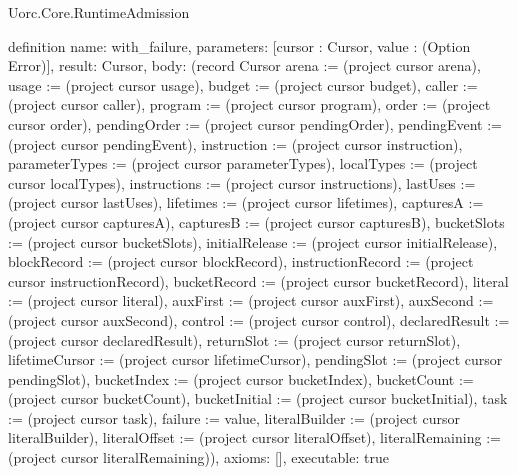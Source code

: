 \begin{lexlean}{Uorc.Core.RuntimeAdmission}
\begin{semanticmodule}
definition{
  name: with_failure,
  parameters: [cursor : Cursor, value : (Option Error)],
  result: Cursor,
  body: (record Cursor {arena := (project cursor arena), usage := (project cursor usage), budget := (project cursor budget), caller := (project cursor caller), program := (project cursor program), order := (project cursor order), pendingOrder := (project cursor pendingOrder), pendingEvent := (project cursor pendingEvent), instruction := (project cursor instruction), parameterTypes := (project cursor parameterTypes), localTypes := (project cursor localTypes), instructions := (project cursor instructions), lastUses := (project cursor lastUses), lifetimes := (project cursor lifetimes), capturesA := (project cursor capturesA), capturesB := (project cursor capturesB), bucketSlots := (project cursor bucketSlots), initialRelease := (project cursor initialRelease), blockRecord := (project cursor blockRecord), instructionRecord := (project cursor instructionRecord), bucketRecord := (project cursor bucketRecord), literal := (project cursor literal), auxFirst := (project cursor auxFirst), auxSecond := (project cursor auxSecond), control := (project cursor control), declaredResult := (project cursor declaredResult), returnSlot := (project cursor returnSlot), lifetimeCursor := (project cursor lifetimeCursor), pendingSlot := (project cursor pendingSlot), bucketIndex := (project cursor bucketIndex), bucketCount := (project cursor bucketCount), bucketInitial := (project cursor bucketInitial), task := (project cursor task), failure := value, literalBuilder := (project cursor literalBuilder), literalOffset := (project cursor literalOffset), literalRemaining := (project cursor literalRemaining)}),
  axioms: [],
  executable: true
}


\end{semanticmodule}
\end{lexlean}
